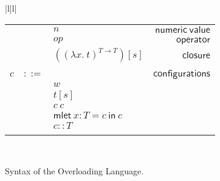 \documentclass[preprint,authoryear,sort&compress,9pt,nocopyrightspace]{article}
\newcommand{\conf}[2][s]{(#2)[#1]}
\newcommand{\subx}{x \mapsto \{\overline{v}\},s}
\newcommand{\subxDT}{x \mapsto \{(\overline{v:T})\},s}
\newcommand{\ascrip}[1]{#1::T}
\newcommand{\negacion}[1]{\mathsf{not} \ #1}
\newcommand{\suma}[1]{\mathsf{add1} \ #1}
\newcommand{\oletPT}[3]{\mathsf{mlet} \ x : #1 = #2 \ \mathsf{in}  \ #3}
\newcommand{\absSTT}[2]{(\lambda #1. \ #2)^{T \to T}}
\newcommand{\semanticD}{Overloading Language}
\begin{document}
\begin{figure}
\begin{small}
\begin{center}
\begin{tabular}{|l|l|}
\begin{tabular}{l c l r}
&&$n$&$\mathsf{numeric \ value} $\\
&&$op$&$\mathsf{operator}$\\
&&$\conf{\absSTT {x}{t}}$&$\mathsf{closure}$\\
&&&\\
$c$&$::=$&&$\mathsf {configurations}$\\
&&$w$&\\
&&$t[s]$&\\
&&$c \ c $&\\
&&$\oletPT{T}{c}{c}$&\\
&&$\ascrip{c}$&\\
&&&\\
\end{tabular}\\
\hline
\end{tabular}
\hspace*{-2cm}
\caption{Syntax of the \semanticD.}
\label{figure:syntaxoverloading}
\end{center}
\end{small}
\end{figure}
\end{document}
